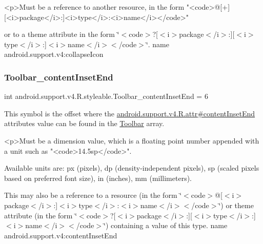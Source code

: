 \begin{DoxyVerb}      <p>Must be a reference to another resource, in the form "<code>@[+][<i>package</i>:]<i>type</i>:<i>name</i></code>"
\end{DoxyVerb}
 or to a theme attribute in the form \char`\"{}$<$code$>$?\mbox{[}$<$i$>$package$<$/i$>$\+:\mbox{]}\mbox{[}$<$i$>$type$<$/i$>$\+:\mbox{]}$<$i$>$name$<$/i$>$$<$/code$>$\char`\"{}.  name android.\+support.\+v4\+:collapse\+Icon \mbox{\label{classandroid_1_1support_1_1v4_1_1R_1_1styleable_a32c9d8c6dd8f327b1ee2c2fe3ab0a630}} 
\subsubsection{\texorpdfstring{Toolbar\+\_\+content\+Inset\+End}{Toolbar\_contentInsetEnd}}
{\footnotesize\ttfamily int android.\+support.\+v4.\+R.\+styleable.\+Toolbar\+\_\+content\+Inset\+End = 6\hspace{0.3cm}{\ttfamily [static]}}

This symbol is the offset where the \hyperlink{classandroid_1_1support_1_1v4_1_1R_1_1attr_af8f89d4cff9e410c8d717f6c8dd01b0c}{android.\+support.\+v4.\+R.\+attr\#content\+Inset\+End} attribute\textquotesingle{}s value can be found in the \hyperlink{classandroid_1_1support_1_1v4_1_1R_1_1styleable_a211358a2f951023c7735caea0fb5ae04}{Toolbar} array.

\begin{DoxyVerb}      <p>Must be a dimension value, which is a floating point number appended with a unit such as "<code>14.5sp</code>".
\end{DoxyVerb}
 Available units are\+: px (pixels), dp (density-\/independent pixels), sp (scaled pixels based on preferred font size), in (inches), mm (millimeters). 

This may also be a reference to a resource (in the form \char`\"{}$<$code$>$@\mbox{[}$<$i$>$package$<$/i$>$\+:\mbox{]}$<$i$>$type$<$/i$>$\+:$<$i$>$name$<$/i$>$$<$/code$>$\char`\"{}) or theme attribute (in the form \char`\"{}$<$code$>$?\mbox{[}$<$i$>$package$<$/i$>$\+:\mbox{]}\mbox{[}$<$i$>$type$<$/i$>$\+:\mbox{]}$<$i$>$name$<$/i$>$$<$/code$>$\char`\"{}) containing a value of this type.  name android.\+support.\+v4\+:content\+Inset\+End \mbox{\label{classandroid_1_1support_1_1v4_1_1R_1_1styleable_ac27607dd846e87108d867c8f656dc01f}} 
